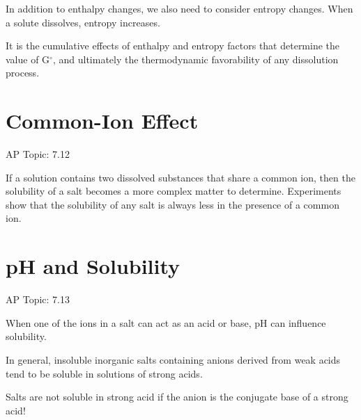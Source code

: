 \documentclass[../chem.tex]{subfiles}
\begin{document}
In addition to enthalpy changes, we also need to consider entropy changes. When a solute dissolves, entropy increases.

It is the cumulative effects of enthalpy and entropy factors that determine the value of G$^{\circ}$, and ultimately the thermodynamic favorability of any dissolution process.
\section{Common-Ion Effect}
AP Topic: 7.12

If a solution contains two dissolved substances that share a common ion, then the solubility of a salt becomes a more complex matter to determine. 
Experiments show that the solubility of any salt is always less in the presence of a common ion.

\section{pH and Solubility}
AP Topic: 7.13

When one of the ions in a salt can act as an acid or base, pH can influence solubility. 

In general, insoluble inorganic salts containing anions derived from weak acids tend to be soluble in solutions of strong acids.

Salts are not soluble in strong acid if the anion is the conjugate base of a strong acid!
\end{document}
